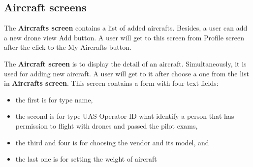 \subsection{Aircraft screens}\label{subsec:aircraft-screens}
The \textbf{Aircrafts screen} contains a list of added aircrafts.
Besides, a user can add a new drone view Add button.
A user will get to this screen from Profile screen after the click to the My Aircrafts button.

The \textbf{Aircraft screen} is to display the detail of an aircraft.
Simultaneously, it is used for adding new aircraft.
A user will get to it after choose a one from the list in \textbf{Aircrafts screen}.
This screen contains a form with four text fields:
\begin{itemize}
    \item the first is for type name,
    \item the second is for type UAS Operator ID what identify a person that has permission to flight with drones and passed the pilot exams,
    \item the third and four is for choosing the vendor and its model, and
    \item the last one is for setting the weight of aircraft
\end{itemize}
